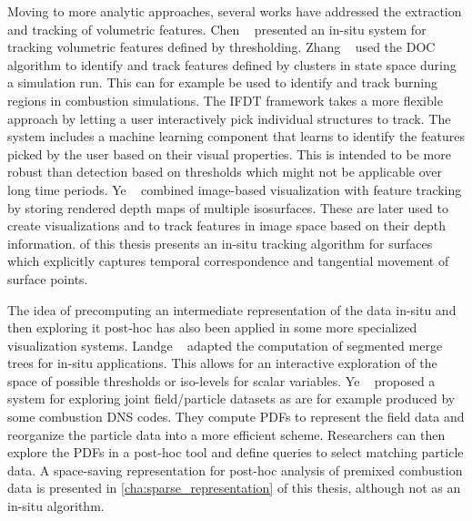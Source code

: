 %
Moving to more analytic approaches, several works have addressed the extraction
and tracking of volumetric features.
%
Chen \etal{}~\cite{Chen2003} presented an in-situ system for tracking volumetric
features defined by thresholding.
%
Zhang \etal{}~\cite{Zhang2012} used the \ac{DOC} algorithm \cite{Quiroz2008} to
identify and track features defined by clusters in state space during a
simulation run.
%
This can for example be used to identify and track burning regions in combustion
simulations.
%
The IFDT framework \cite{Duque2012} takes a more flexible approach by letting a
user interactively pick individual structures to track.
%
The system includes a machine learning component that learns to identify the
features picked by the user based on their visual properties.
%
This is intended to be more robust than detection based on thresholds which
might not be applicable over long time periods.
%
Ye \etal{}~\cite{Ye2015} combined image-based visualization with feature tracking
by storing rendered depth maps of multiple isosurfaces.
%
These are later used to create visualizations and to track features in image
space based on their depth information.
%
 of this thesis presents an in-situ tracking
algorithm for surfaces which explicitly captures temporal correspondence and
tangential movement of surface points.
%

%
The idea of precomputing an intermediate representation of the data in-situ and
then exploring it post-hoc has also been applied in some more specialized
visualization systems.
%
Landge \etal{}~\cite{Landge2014} adapted the computation of segmented merge trees
\cite{Bremer2009,Bremer2011} for in-situ applications.
%
This allows for an interactive exploration of the space of possible thresholds
or iso-levels for scalar variables.
%
Ye \etal{}~\cite{Ye2016} proposed a system for exploring joint field/particle
datasets as are for example produced by some combustion \ac{DNS} codes.
%
They compute \acp{PDF} to represent the field data and reorganize the particle
data into a more efficient scheme.
%
Researchers can then explore the \acp{PDF} in a post-hoc tool and define queries
to select matching particle data.
%
A space-saving representation for post-hoc analysis of premixed combustion data
is presented in \cref{cha:sparse_representation} of this thesis, although not as
an in-situ algorithm.
%
%
%
%
